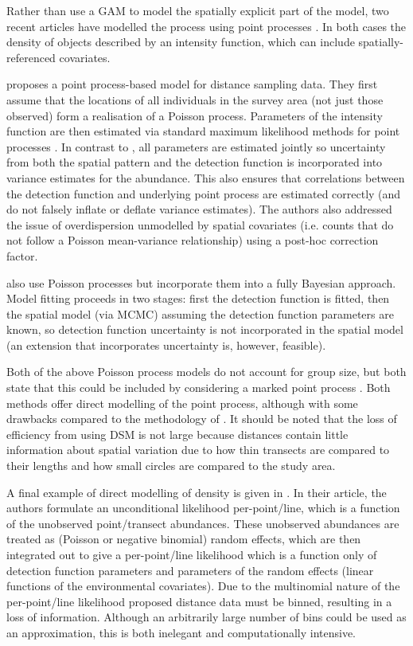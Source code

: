 \documentclass[a4paper,12pt]{article}
\begin{document}
Rather than use a GAM to model the spatially explicit part of the model, two recent articles \citep{Johnson:2010gf,Niemi:2010kx} have modelled the process using point processes \citep{cox1980point}. In both cases the density of objects described by an intensity function, which can include spatially-referenced covariates.

\cite{Johnson:2010gf} proposes a point process-based model for distance sampling data. They first assume that the locations of all individuals in the survey area (not just those observed) form a realisation of a Poisson process. Parameters of the intensity function are then estimated via standard maximum likelihood methods for point processes \citep{Baddeley:2000to}. In contrast to \cite{Hedley:2004et}, all parameters are estimated jointly so uncertainty from both the spatial pattern and the detection function is incorporated into variance estimates for the abundance. This also ensures that correlations between the detection function and underlying point process are estimated correctly (and do not falsely inflate or deflate variance estimates). The authors also addressed the issue of overdispersion unmodelled by spatial covariates (i.e. counts that do not follow a Poisson mean-variance relationship) using a post-hoc correction factor.

\cite{Niemi:2010kx} also use Poisson processes but incorporate them into a fully Bayesian approach. Model fitting proceeds in two stages: first the detection function is fitted, then the spatial model (via MCMC) assuming the detection function parameters are known, so detection function uncertainty is not incorporated in the spatial model (an extension that incorporates uncertainty is, however, feasible).

Both of the above Poisson process models do not account for group size, but both state that this could be included by considering a marked point process \citep[Section 5.5]{cox1980point}. Both methods offer direct modelling of the point process, although with some drawbacks compared to the methodology of \cite{Hedley:2004et}. It should be noted that the loss of efficiency from using DSM is not large \citep[p. 313]{Buckland:2004ts} because distances contain little information about spatial variation due to how thin transects are compared to their lengths and how small circles are compared to the study area.

A final example of direct modelling of density is given in \cite{Royle:2004tu}. In their article, the authors formulate an unconditional likelihood per-point/line, which is a function of the unobserved point/transect abundances. These unobserved abundances are treated as (Poisson or negative binomial) random effects, which are then integrated out to give a per-point/line likelihood which is a function only of detection function parameters and parameters of the random effects (linear functions of the environmental covariates). Due to the multinomial nature of the per-point/line likelihood proposed distance data must be binned, resulting in a loss of information. Although an arbitrarily large number of bins could be used as an approximation, this is both inelegant and computationally intensive.
\end{document}
